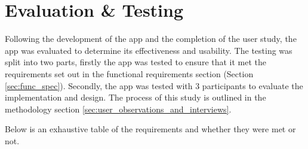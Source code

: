 \documentclass [11pt,a4paper]{article}
\begin{document}
\section{Evaluation \& Testing}
\label{sec:evaluation}

Following the development of the app and the completion of the user study, the app was evaluated to determine its effectiveness and usability. The testing was split into two parts, firstly the app was tested to ensure that it met the requirements set out in the functional requirements section (Section \ref{sec:func_spec}). Secondly, the app was tested with 3 participants to evaluate the implementation and design. The process of this study is outlined in the methodology section \ref{sec:user_observations_and_interviews}. 

Below is an exhaustive table of the requirements and whether they were met or not.
\end{document}
